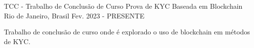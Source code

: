 

\begin{cventries}

  \cventry
    {TCC - Trabalho de Conclusão de Curso} %
    {Prova de KYC Baseada em Blockchain} %
    {Rio de Janeiro, Brasil} %
    {Fev. 2023 - PRESENTE} %
    {
      \begin{cvitems} %
        \item {Trabalho de conclusão de curso onde é explorado o uso de blockchain em métodos de KYC.}
      \end{cvitems}
    }

\end{cventries}
